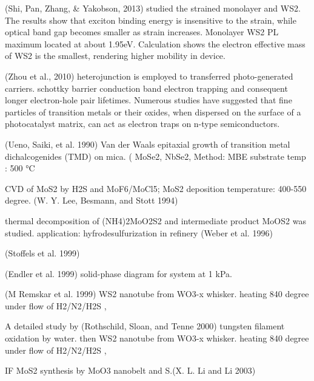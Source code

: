 (Shi, Pan, Zhang, & Yakobson, 2013) studied the strained monolayer  and WS2. The results show that exciton binding energy is insensitive to the strain, while optical band gap becomes smaller as strain increases. Monolayer WS2 PL maximum located at about 1.95eV. Calculation shows the electron effective mass of WS2 is the smallest, rendering higher mobility in device.

(Zhou et al., 2010) heterojunction is employed to transferred photo-generated carriers. schottky barrier conduction band electron trapping and consequent longer electron-hole pair lifetimes. Numerous studies have suggested that fine particles of transition metals or their oxides, when dispersed on the surface of a photocatalyst matrix, can act as electron traps on n-type semiconductors.

(Ueno, Saiki, et al. 1990) Van der Waals epitaxial growth of transition metal dichalcogenides (TMD) on mica. ( MoSe2, NbSe2,
Method: MBE substrate temp : 500 \si{\degreeCelsius}

CVD of MoS2 by H2S and MoF6/MoCl5; MoS2 deposition temperature: 400-550 degree. (W. Y. Lee, Besmann, and Stott 1994)

thermal decomposition of (NH4)2MoO2S2 and intermediate product MoOS2 was studied. application: hyfrodesulfurization in refinery (Weber et al. 1996) 

 (Stoffels et al. 1999)

(Endler et al. 1999) solid-phase diagram for  system at 1 kPa. 

(M Remskar et al. 1999) WS2 nanotube from WO3-x whisker. heating 840 degree under flow of H2/N2/H2S ,

A detailed study by (Rothschild, Sloan, and Tenne 2000) tungsten filament oxidation by water. then WS2 nanotube from WO3-x whisker. heating 840 degree under flow of H2/N2/H2S ,

IF MoS2 synthesis by MoO3 nanobelt and S.(X. L. Li and Li 2003) 


